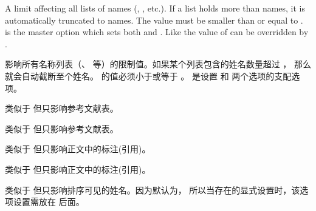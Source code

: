 \begin{optionlist}
A limit affecting all lists of names (, , etc.). If a list holds more than  names, it is automatically truncated to  names. The  value must be smaller than or equal to .  is the master option which sets both  and . Like  the value of  can be overridden by .

影响所有名称列表（、 等）的限制值。如果某个列表包含的姓名数量超过 ，
那么就会自动截断至个姓名。 的值必须小于或等于 。
 是设置  和  两个选项的支配选项。



类似于  但只影响参考文献表。



类似于   但只影响参考文献表。



类似于  但只影响正文中的标注(引用)。



类似于  但只影响正文中的标注(引用)。


类似于  但只影响排序可见的姓名。因为默认为，
所以当存在的显式设置时，该选项设置需放在 后面。





\end{optionlist}
